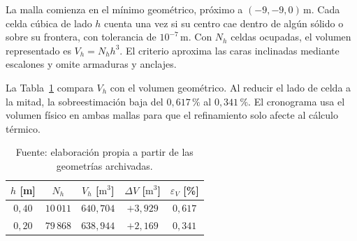 La malla comienza en el mínimo geométrico, próximo a $(-9,-9,0)\,\mathrm m$. Cada celda cúbica de lado $h$ cuenta una vez si su centro cae dentro de algún sólido o sobre su frontera, con tolerancia de $10^{-7}\,\mathrm m$. Con $N_h$ celdas ocupadas, el volumen representado es $V_h=N_hh^3$. El criterio aproxima las caras inclinadas mediante escalones y omite armaduras y anclajes.

La Tabla~\ref{tab:volumen-voxelizacion} compara $V_h$ con el volumen geométrico. Al reducir el lado de celda a la mitad, la sobreestimación baja del $0{,}617\,\text{\%}$ al $0{,}341\,\text{\%}$. El cronograma usa el volumen físico en ambas mallas para que el refinamiento solo afecte al cálculo térmico.
\begin{table}[htbp]
  \centering
  \caption{Comparación del volumen geométrico y discretizado de la fundación}
  \label{tab:volumen-voxelizacion}
  \small
  \begin{tabular}{ccccc}
    \toprule
    $h$ [m] & $N_h$ & $V_h$ [$\mathrm{m^3}$] & $\Delta V$ [$\mathrm{m^3}$] & $\varepsilon_V$ [\%] \\
    \midrule
    $0{,}40$ & $10\,011$ & $640{,}704$ & $+3{,}929$ & $0{,}617$ \\
    $0{,}20$ & $79\,868$ & $638{,}944$ & $+2{,}169$ & $0{,}341$ \\
    \bottomrule
  \end{tabular}
  \captionsetup{skip=2pt}
  \caption*{Fuente: elaboración propia a partir de las geometrías archivadas.}
\end{table}

